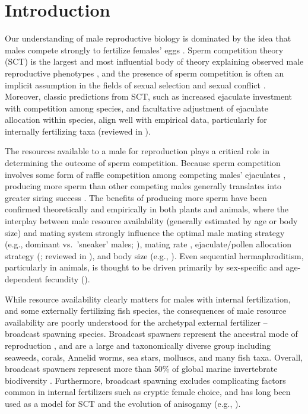 \documentclass{article}
\begin{document}
\newpage


\section{Introduction}

Our understanding of male reproductive biology is dominated by the idea that males compete strongly to fertilize females' eggs \citep{Bateman1948, Parker1972, Parker1982}. Sperm competition theory (SCT) is the largest and most influential body of theory explaining observed male reproductive phenotypes \citep{Parker1972, Parker1982,Wedell2002}, and the presence of sperm competition is often an implicit assumption in the fields of sexual selection and sexual conflict \citep{BirkheadMoller1998, ArnqvistRowe2005}. Moreover, classic predictions from SCT, such as increased ejaculate investment with competition among species, and facultative adjustment of ejaculate allocation within species, align well with empirical data, particularly for internally fertilizing taxa (reviewed in \citealt{Wedell2002}). 

The resources available to a male for reproduction plays a critical role in determining the outcome of sperm competition. Because sperm competition involves some form of raffle competition among competing males' ejaculates \citep{Wedell2002, ArnqvistRowe2005}, producing more sperm than other competing males generally translates into greater siring success \citep{Parker1972, Parker1982, Wedell2002}. The benefits of producing more sperm have been confirmed theoretically and empirically in both plants and animals, where the interplay between male resource availability (generally estimated by age or body size) and mating system strongly influence the optimal male mating strategy (e.g., dominant vs.~'sneaker' males; \citealt{Parker1990a,Parker1990b,GageEtAl1995}), mating rate \citep{Parker1990b, BirkheadMoller1998, Wedell2002}, ejaculate/pollen allocation strategy (\citealt{FriedmanBarrett2009}; reviewed in \citealt{Wedell2002, Zhang2006}), and body size (e.g., \citealt{ArnoldWade1984}). Even sequential hermaphroditism, particularly in animals, is thought to be driven primarily by sex-specific and age-dependent fecundity (\citealt{Ghiselin1969, Warner1975, Warner1988, MundayWarner2006}).

While resource availability clearly matters for males with internal fertilization, and some externally fertilizing fish species, the consequences of male resource availability are poorly understood for the archetypal external fertilizer -- broadcast spawning species. Broadcast spawners represent the ancestral mode of reproduction \citep{RouFitz1994}, and are a large and taxonomically diverse group including seaweeds, corals, Annelid worms, sea stars, molluscs, and many fish taxa. Overall, broadcast spawners represent more than 50\% of global marine invertebrate biodiversity \citep{MonroMarshall2015}. Furthermore, broadcast spawning excludes complicating factors common in internal fertilizers such as cryptic female choice, and has long been used as a model for SCT and the evolution of anisogamy (e.g., \citealt{Parker1972, Parker1982,Parker2017}). 
\end{document}
